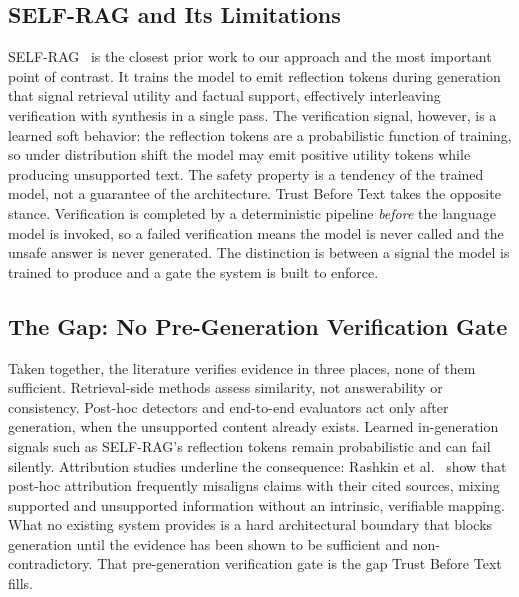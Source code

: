 \subsection{SELF-RAG and Its Limitations}
SELF-RAG~\cite{asai2023selfrag} is the closest prior work to our approach
and the most important point of contrast. It trains the model to emit
reflection tokens during generation that signal retrieval utility and
factual support, effectively interleaving verification with synthesis in a
single pass. The verification signal, however, is a learned soft behavior:
the reflection tokens are a probabilistic function of training, so under
distribution shift the model may emit positive utility tokens while
producing unsupported text. The safety property is a tendency of the
trained model, not a guarantee of the architecture. Trust Before Text
takes the opposite stance. Verification is completed by a deterministic
pipeline \textit{before} the language model is invoked, so a failed
verification means the model is never called and the unsafe answer is
never generated. The distinction is between a signal the model is trained
to produce and a gate the system is built to enforce.

\subsection{The Gap: No Pre-Generation Verification Gate}
Taken together, the literature verifies evidence in three places, none of
them sufficient. Retrieval-side methods assess similarity, not
answerability or consistency. Post-hoc detectors and end-to-end evaluators
act only after generation, when the unsupported content already exists.
Learned in-generation signals such as SELF-RAG's reflection tokens remain
probabilistic and can fail silently. Attribution studies underline the
consequence: Rashkin et al.~\cite{rashkin2023attribution} show that
post-hoc attribution frequently misaligns claims with their cited sources,
mixing supported and unsupported information without an intrinsic,
verifiable mapping. What no existing system provides is a hard
architectural boundary that blocks generation until the evidence has been
shown to be sufficient and non-contradictory. That pre-generation
verification gate is the gap Trust Before Text fills.
